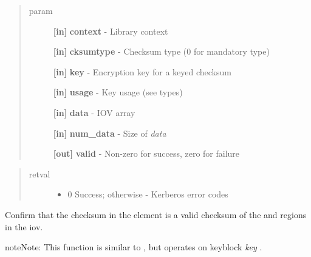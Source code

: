 \documentclass[letterpaper,10pt,english]{sphinxmanual}
\begin{document}
\begin{quote}\begin{description}
\item[{param}] \leavevmode
\textbf{{[}in{]}} \textbf{context} - Library context

\textbf{{[}in{]}} \textbf{cksumtype} - Checksum type (0 for mandatory type)

\textbf{{[}in{]}} \textbf{key} - Encryption key for a keyed checksum

\textbf{{[}in{]}} \textbf{usage} - Key usage (see  types)

\textbf{{[}in{]}} \textbf{data} - IOV array

\textbf{{[}in{]}} \textbf{num\_data} - Size of \emph{data}

\textbf{{[}out{]}} \textbf{valid} - Non-zero for success, zero for failure

\end{description}\end{quote}
\begin{quote}\begin{description}
\item[{retval}] \leavevmode\begin{itemize}
\item {} 
0   Success; otherwise - Kerberos error codes

\end{itemize}

\end{description}\end{quote}

Confirm that the checksum in the {\hyperref[appdev/refs/macros/KRB5_CRYPTO_TYPE_CHECKSUM:KRB5_CRYPTO_TYPE_CHECKSUM]{}} element is a valid checksum of the {\hyperref[appdev/refs/macros/KRB5_CRYPTO_TYPE_DATA:KRB5_CRYPTO_TYPE_DATA]{}} and {\hyperref[appdev/refs/macros/KRB5_CRYPTO_TYPE_SIGN_ONLY:KRB5_CRYPTO_TYPE_SIGN_ONLY]{}} regions in the iov.




{\hyperref[appdev/refs/api/krb5_c_make_checksum_iov:krb5_c_make_checksum_iov]{}}



\begin{notice}{note}{Note:}
This function is similar to {\hyperref[appdev/refs/api/krb5_k_verify_checksum_iov:krb5_k_verify_checksum_iov]{}} , but operates on keyblock \emph{key} .
\end{notice}
\end{document}
